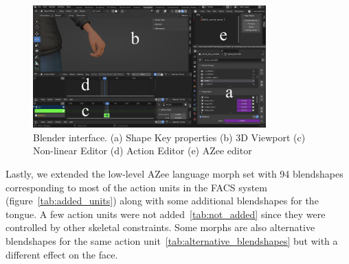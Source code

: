 \documentclass[../../main]{subfiles}
\begin{document}
\begin{figure}
    \centering
    \includegraphics[width=0.8\textwidth]{chapters/facial_expressions/images/shape_keys.png}
    \caption{Blender interface. (a) Shape Key properties (b) 3D Viewport (c) Non-linear Editor (d) Action Editor (e) AZee editor}
    \label{ch:facial_expressions:fig:shape_keys}
\end{figure}

Lastly, we extended the low-level AZee language morph set with 94 blendshapes corresponding to most of the action units in the FACS system (figure~\ref{tab:added_units}) along with some additional blendshapes for the tongue. A few action units were not added~\ref{tab:not_added} since they were controlled by other skeletal constraints. Some morphs are also alternative blendshapes for the same action unit~\ref{tab:alternative_blendshapes} but with a different effect on the face.
\end{document}
